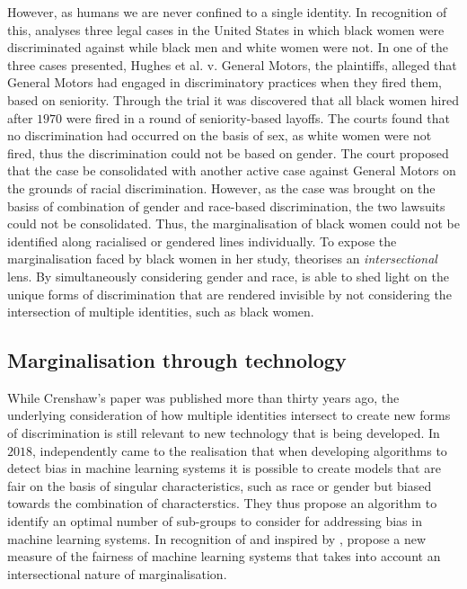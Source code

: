 However, as humans we are never confined to a single identity. In recognition of this, \cite{Crenshaw:1989} analyses three legal cases in the United States in which black women were discriminated against while black men and white women were not. In one of the three cases presented, Hughes et al. v. General Motors, the plaintiffs, alleged that General Motors had engaged in discriminatory practices when they fired them, based on seniority. Through the trial it was discovered that all black women hired after $1970$ were fired in a round of seniority-based layoffs. The courts found that no discrimination had occurred on the basis of sex, as white women were not fired, thus the discrimination could not be based on gender. The court proposed that the case be consolidated with another active case against General Motors on the grounds of racial discrimination. However, as the case was brought on the basiss of combination of gender and race-based discrimination, the two lawsuits could not be consolidated. Thus, the marginalisation of black women could not be identified along racialised or gendered lines individually. To expose the marginalisation faced by black women in her study, \cite{Crenshaw:1989} theorises an \textit{intersectional} lens. By simultaneously considering gender and race, \cite{Crenshaw:1989} is able to shed light on the unique forms of discrimination that are rendered invisible by not considering the intersection of multiple identities, such as black women.

\subsection{Marginalisation through technology}

While Crenshaw's paper was published more than thirty years ago, the underlying consideration of how multiple identities intersect to create new forms of discrimination is still relevant to new technology that is being developed. In $2018$, \cite{Kearns:2018} independently came to the realisation that when developing algorithms to detect bias in machine learning systems it is possible to create models that are fair on the basis of singular characteristics, such as race or gender but biased towards the combination of characterstics. They thus propose an algorithm to identify an optimal number of sub-groups to consider for addressing bias in machine learning systems. In recognition of \cite{Kearns:2018} and inspired by \cite{Crenshaw:1989}, \cite{Foulds:2019} propose a new measure of the fairness of machine learning systems that takes into account an intersectional nature of marginalisation.

